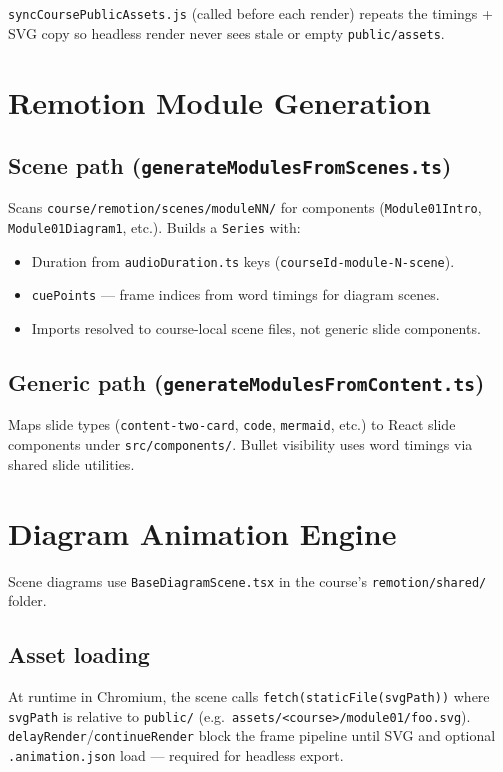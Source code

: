 \documentclass{scinexus}
\begin{document}
\texttt{syncCoursePublicAssets.js} (called before each render) repeats the timings + SVG copy so headless render never sees stale or empty \texttt{public/assets}.

\section{Remotion Module Generation}

\subsection{Scene path (\texttt{generateModulesFromScenes.ts})}

Scans \texttt{course/remotion/scenes/moduleNN/} for components (\texttt{Module01Intro}, \texttt{Module01Diagram1}, etc.). Builds a \texttt{Series} with:

\begin{itemize}
	\item Duration from \texttt{audioDuration.ts} keys (\texttt{courseId-module-N-scene}).
	\item \texttt{cuePoints} --- frame indices from word timings for diagram scenes.
	\item Imports resolved to course-local scene files, not generic slide components.
\end{itemize}

\subsection{Generic path (\texttt{generateModulesFromContent.ts})}

Maps slide types (\texttt{content-two-card}, \texttt{code}, \texttt{mermaid}, etc.) to React slide components under \texttt{src/components/}. Bullet visibility uses word timings via shared slide utilities.

\section{Diagram Animation Engine}

Scene diagrams use \texttt{BaseDiagramScene.tsx} in the course's \texttt{remotion/shared/} folder.

\subsection{Asset loading}

At runtime in Chromium, the scene calls \texttt{fetch(staticFile(svgPath))} where \texttt{svgPath} is relative to \texttt{public/} (e.g.\ \texttt{assets/<course>/module01/foo.svg}). \texttt{delayRender}/\texttt{continueRender} block the frame pipeline until SVG and optional \texttt{.animation.json} load --- required for headless export.
\end{document}
